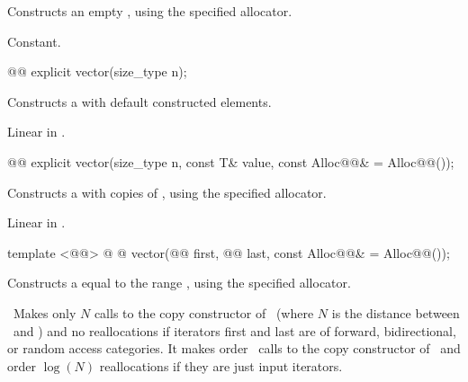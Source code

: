 \documentclass[american,twoside]{book}
\begin{document}
\begin{itemdescr}
\pnum
\effects Constructs an empty , using the
specified allocator.

\pnum
\complexity Constant.
\end{itemdescr}

\begin{itemdecl}
@@ explicit vector(size_type n);
\end{itemdecl}

\begin{itemdescr}
\pnum
\effects Constructs a  with 
default constructed elements.

\pnum
{}

\pnum
\complexity Linear in .
\end{itemdescr}

\begin{itemdecl}
@@
explicit vector(size_type n, const T& value,
                const Alloc@@& = Alloc@@());
\end{itemdecl}

\begin{itemdescr}
\pnum
\effects Constructs a  with 
copies of , using the specified allocator.

\pnum
{}

\pnum
\complexity Linear in .
\end{itemdescr}

\begin{itemdecl}
template <@@>
  @ @ 
  vector(@@ first, @@ last,
         const Alloc@@& = Alloc@@());
\end{itemdecl}

\begin{itemdescr}

\pnum
\effects Constructs a  equal to the
range , using the specified allocator.

\pnum
\complexity\ 
Makes only $N$
calls to the copy constructor of
\
(where $N$
is the distance between
\
and
)
and no reallocations if iterators first and last are of forward, bidirectional, or random access categories.
It makes order
\tcode{N}\
calls to the copy constructor of
\tcode{T}\
and order
$\log(N)$
reallocations if they are just input iterators.
\end{itemdescr}
\end{document}
